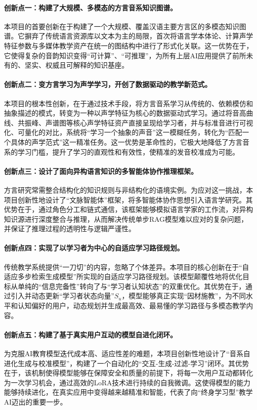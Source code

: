 \paragraph{创新点一：构建了大规模、多模态的方言音系知识图谱。}
本项目的首要创新在于构建了一个大规模、覆盖汉语主要方言区的多模态知识图谱。它摒弃了传统语言资源库以文本为主的局限，首次将语言学本体论、计算声学特征参数与多媒体教学资产在统一的图结构中进行了形式化关联。这一优势在于，它使得复杂的音韵知识变得“可计算”、“可推理”，为所有上层AI应用提供了前所未有的、坚实、权威且可解释的知识基座。

\paragraph{创新点二：变方言学习为声学学习，开创了数据驱动的教学新范式。}
本项目的根本性创新，在于通过技术手段，将方言音系学习从传统的、依赖模仿和抽象描述的模式，转变为一种以声学特征为核心的数据驱动式学习。通过将音高曲线、共振峰、声谱图等核心声学特征资产直接呈现给学习者，并与标准音进行可视化、可量化的对比，系统将“学习一个抽象的声音”这一模糊任务，转化为“匹配一个具体的声学范式”这一精准任务。这一优势是革命性的，它极大地降低了方言音系的学习门槛，提升了学习的直观性和有效性，使精准的发音校准成为可能。

\paragraph{创新点三：设计了面向异构语言知识的多智能体协作推理框架。}
方言研究常需整合结构化的知识规则与非结构化的语境实例。为应对这一挑战，本项目创新性地设计了“文脉智能体”框架，将多智能体协作思想引入语言学研究。其优势在于，通过角色分工和链式通信，该框架能够模拟语言学家的工作流，对异构知识源进行深度整合与推理，从而解决传统单步RAG模型难以应对的复杂问题，并保证了推理过程的透明性与逻辑严谨性。

\paragraph{创新点四：实现了以学习者为中心的自适应学习路径规划。}
传统教学系统提供“一刀切”的内容，忽略了个体差异。本项目的核心创新在于“自适应多步检索生成模型”所实现的自适应学习路径规划。该模型颠覆性地将优化目标从单纯的“信息完备性”转向了与“学习者认知状态”的双重优化。其优势在于，通过引入并动态更新“学习者状态向量”$S_u$，模型能够真正实现“因材施教”，为不同水平和认知偏好的用户，动态规划并生成最高效、最易懂的学习路径与多模态教学内容。

\paragraph{创新点五：构建了基于真实用户互动的模型自进化闭环。}
为克服AI教育模型迭代成本高、适应性差的难题，本项目创新性地设计了“音系自进化生成与校准模型”，构建了一个自动化的“交互-生成-过滤-学习”闭环。其优势在于，该机制使得模型能够在保障安全和质量的前提下，将每一次用户互动都转化为一次学习机会，通过高效的LoRA技术进行持续的自我微调。这使得模型的能力能够持续进化，在真实应用中变得越来越精准和智能，代表了向“终身学习型”教学AI迈出的重要一步。

